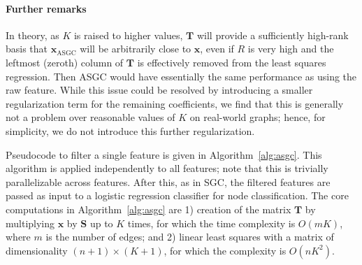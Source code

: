 \documentclass{article}
\begin{document}
\paragraph{Further remarks} In theory, as $K$ is raised to higher values, $\bm{T}$ will provide a sufficiently high-rank basis that  $\bm{x}_\text{ASGC}$ will be arbitrarily close to $\bm{x}$, even if $R$ is very high and the leftmost (zeroth) column of $\bm{T}$ is effectively removed from the least squares regression.
Then ASGC would have essentially the same performance as using the raw feature. While this issue could be resolved by introducing a smaller regularization term for the remaining coefficients, we find that this is generally not a problem over reasonable values of $K$ on real-world graphs; hence, for simplicity, we do not introduce this further regularization.

Pseudocode to filter a single feature is given in Algorithm~\ref{alg:asgc}. This algorithm is applied independently to all features; note that this is trivially parallelizable across features.
After this, as in SGC, the filtered features are passed as input to a logistic regression classifier for node classification.
The core computations in Algorithm~\ref{alg:asgc} are 1) creation of the matrix $\bm{T}$ by multiplying $\bm{x}$ by $\bm{S}$ up to $K$ times, for which the time complexity is $O(mK)$, where $m$ is the number of edges; and 2) linear least squares with a matrix of dimensionality $(n+1) \times (K+1)$, for which the complexity is $O(n K^2)$.
\end{document}
